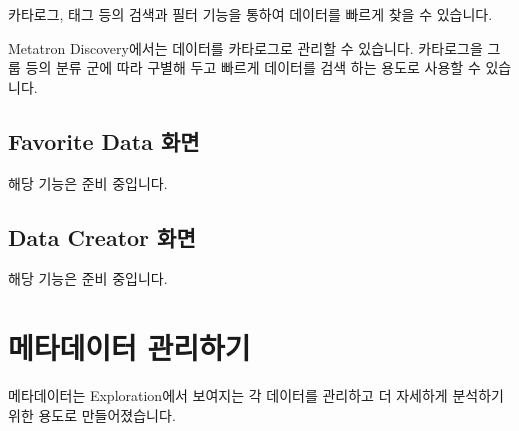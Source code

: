 \documentclass[letterpaper,10pt,english]{sphinxmanual}
\begin{document}
카타로그, 태그 등의 검색과 필터 기능을 통하여 데이터를 빠르게 찾을 수 있습니다.
\begin{quote}

\begin{figure}[H]
\centering

\noindent{}
\end{figure}
\end{quote}

Metatron Discovery에서는 데이터를 카타로그로 관리할 수 있습니다. 카타로그을 그룹 등의 분류 군에 따라 구별해 두고 빠르게 데이터를 검색 하는 용도로 사용할 수 있습니다.
\begin{quote}

\begin{figure}[H]
\centering

\noindent{}
\end{figure}
\end{quote}


\subsection{Favorite Data 화면}
\label{\detokenize{discovery/part09/dataexploration:favorite-data}}
해당 기능은 준비 중입니다.


\subsection{Data Creator 화면}
\label{\detokenize{discovery/part09/dataexploration:data-creator}}
해당 기능은 준비 중입니다.


\section{메타데이터 관리하기}
\label{\detokenize{discovery/part09/metadata:id1}}\label{\detokenize{discovery/part09/metadata::doc}}
메타데이터는 Exploration에서 보여지는 각 데이터를 관리하고 더 자세하게 분석하기 위한 용도로 만들어졌습니다.
\begin{quote}

\begin{figure}[H]
\centering

\noindent{}
\end{figure}

\begin{figure}[H]
\centering

\noindent{}
\end{figure}
\end{quote}
\end{document}
